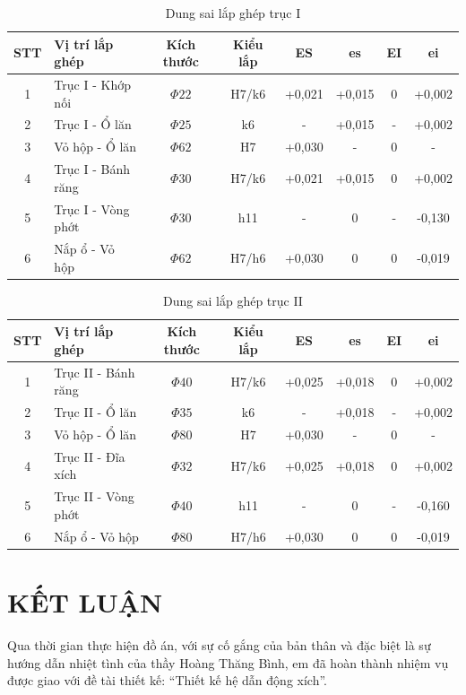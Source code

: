 \documentclass[12pt,a4paper]{report}
\begin{document}
\begin{table}[H]
    \centering
    \caption{Dung sai lắp ghép trục I}
    \label{tab:6.1}
    \begin{tabular}{|c|l|c|c|c|c|c|c|}
        \hline
        \textbf{STT} & \textbf{Vị trí lắp ghép} & \textbf{Kích thước} & \textbf{Kiểu lắp} & \textbf{ES} & \textbf{es} & \textbf{EI} & \textbf{ei} \\
        \hline
        1 & Trục I - Khớp nối & $\Phi 22$ & H7/k6 & +0,021 & +0,015 & 0 & +0,002 \\
        2 & Trục I - Ổ lăn & $\Phi 25$ & k6 & - & +0,015 & - & +0,002 \\
        3 & Vỏ hộp - Ổ lăn & $\Phi 62$ & H7 & +0,030 & - & 0 & - \\
        4 & Trục I - Bánh răng & $\Phi 30$ & H7/k6 & +0,021 & +0,015 & 0 & +0,002 \\
        5 & Trục I - Vòng phớt & $\Phi 30$ & h11 & - & 0 & - & -0,130 \\
        6 & Nắp ổ - Vỏ hộp & $\Phi 62$ & H7/h6 & +0,030 & 0 & 0 & -0,019 \\
        \hline
    \end{tabular}
\end{table}

\begin{table}[H]
    \centering
    \caption{Dung sai lắp ghép trục II}
    \label{tab:6.2}
    \begin{tabular}{|c|l|c|c|c|c|c|c|}
        \hline
        \textbf{STT} & \textbf{Vị trí lắp ghép} & \textbf{Kích thước} & \textbf{Kiểu lắp} & \textbf{ES} & \textbf{es} & \textbf{EI} & \textbf{ei} \\
        \hline
        1 & Trục II - Bánh răng & $\Phi 40$ & H7/k6 & +0,025 & +0,018 & 0 & +0,002 \\
        2 & Trục II - Ổ lăn & $\Phi 35$ & k6 & - & +0,018 & - & +0,002 \\
        3 & Vỏ hộp - Ổ lăn & $\Phi 80$ & H7 & +0,030 & - & 0 & - \\
        4 & Trục II - Đĩa xích & $\Phi 32$ & H7/k6 & +0,025 & +0,018 & 0 & +0,002 \\
        5 & Trục II - Vòng phớt & $\Phi 40$ & h11 & - & 0 & - & -0,160 \\
        6 & Nắp ổ - Vỏ hộp & $\Phi 80$ & H7/h6 & +0,030 & 0 & 0 & -0,019 \\
        \hline
    \end{tabular}
\end{table}

\chapter*{KẾT LUẬN}
Qua thời gian thực hiện đồ án, với sự cố gắng của bản thân và đặc biệt là sự hướng dẫn nhiệt tình của thầy Hoàng Thăng Bình, em đã hoàn thành nhiệm vụ được giao với đề tài thiết kế: ``Thiết kế hệ dẫn động xích''. 
\end{document}
